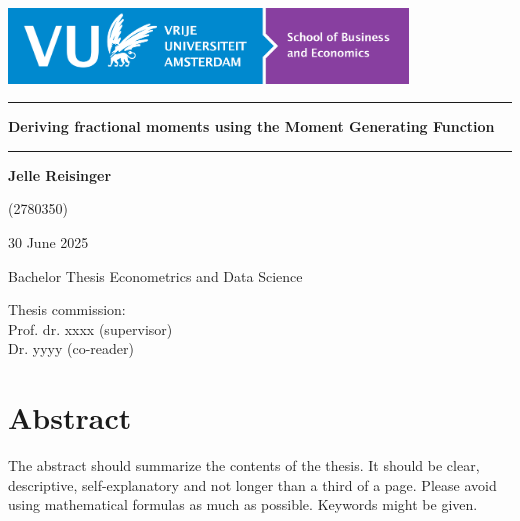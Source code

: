 \documentclass[a4paper,11pt]{article}
\theoremstyle{plain}
\theoremstyle{definition}
\begin{document}

\thispagestyle{empty}

\includegraphics[height=2cm]{figures/LogoSBE.png}

\vspace*{3cm}

\noindent
\rule{\textwidth}{0.8pt}
\begin{center}
{\huge\bf
\noindent
Deriving fractional moments using the Moment Generating Function
}
\end{center}

\vspace*{-8pt}
\noindent
\rule{\textwidth}{0.8pt}

\vspace*{2cm}

\begin{center}
{\LARGE\bf
Jelle Reisinger
}

{\Large
\vspace*{0.5cm}
(2780350)


\vspace*{2cm}

30 June 2025
}
\end{center}

\vspace*{2cm}

{\Large
\noindent
Bachelor Thesis Econometrics and Data Science
}

\vspace*{1cm}

{\Large
\noindent
Thesis commission:\\[0.3cm]
Prof. dr. xxxx (supervisor)\\[0.3cm]
Dr. yyyy (co-reader)
}


\newpage

\setcounter{page}{1}

\section*{Abstract}
The abstract should summarize the contents of the thesis.
It should be clear, descriptive, self-explanatory and not longer
than a third of a page. Please avoid using mathematical
formulas as much as possible.
Keywords might be given.
\end{document}
